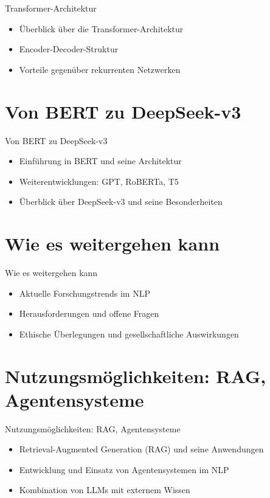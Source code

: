 \documentclass[aspectratio=1610, xcolor=dvipsnames, 9pt]{beamer}
\begin{document}
\begin{frame}{Transformer-Architektur}
  \begin{itemize}
    \item Überblick über die Transformer-Architektur
    \item Encoder-Decoder-Struktur
    \item Vorteile gegenüber rekurrenten Netzwerken
  \end{itemize}
\end{frame}

\section{Von BERT zu DeepSeek-v3}

\begin{frame}{Von BERT zu DeepSeek-v3}
  \begin{itemize}
    \item Einführung in BERT und seine Architektur
    \item Weiterentwicklungen: GPT, RoBERTa, T5
    \item Überblick über DeepSeek-v3 und seine Besonderheiten
  \end{itemize}
\end{frame}

\section{Wie es weitergehen kann}

\begin{frame}{Wie es weitergehen kann}
  \begin{itemize}
    \item Aktuelle Forschungstrends im NLP
    \item Herausforderungen und offene Fragen
    \item Ethische Überlegungen und gesellschaftliche Auswirkungen
  \end{itemize}
\end{frame}

\section{Nutzungsmöglichkeiten: RAG, Agentensysteme}

\begin{frame}{Nutzungsmöglichkeiten: RAG, Agentensysteme}
  \begin{itemize}
    \item Retrieval-Augmented Generation (RAG) und seine Anwendungen
    \item Entwicklung und Einsatz von Agentensystemen im NLP
    \item Kombination von LLMs mit externem Wissen
  \end{itemize}
\end{frame}
\end{document}
